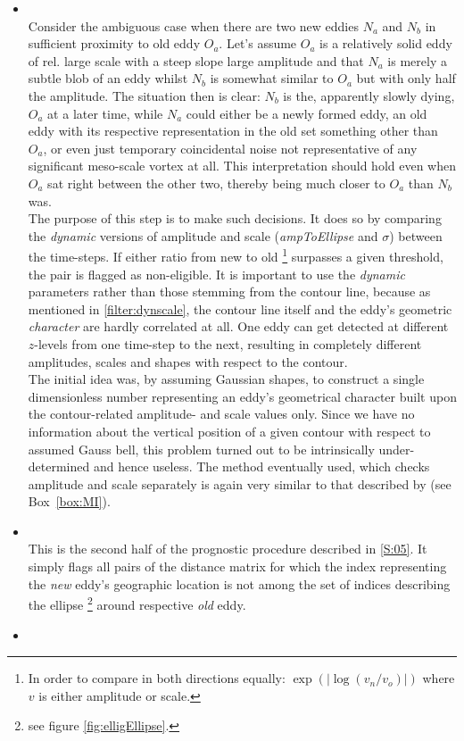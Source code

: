 \begin{itemize}
	\item
	 \\
	 Consider the ambiguous case when there are two new eddies $N_a$ and $N_b$ in sufficient proximity to old eddy $O_a$. Let's assume $O_a$ is a relatively solid eddy of rel. large scale with a steep slope \ie large amplitude and that $N_a$ is merely a subtle blob of an eddy whilst $N_b$ is somewhat similar to $O_a$ but with only half the amplitude. The situation then is clear: $N_b$ is the, apparently slowly dying, $O_a$ at a later time, while $N_a$ could either be a newly formed eddy, an old eddy with its respective representation in the old set something other than $O_a$, or even just temporary coincidental noise not representative of any significant meso-scale vortex at all. This interpretation should hold even when $O_a$ sat right between the other two, thereby being much closer to $O_a$ than $N_b$ was.\\
	 The purpose of this step is to make such decisions. It does so by comparing the \textit{dynamic} versions of amplitude and scale (\textit{ampToEllipse} and $\sigma$) between the time-steps. If either ratio from new to old \footnote{In order to compare in both directions equally: $\exp{(\left|\log{(v_n/v_o)}\right|)}$ where $v$ is either amplitude or scale.} surpasses a given threshold, the pair is flagged as non-eligible. It is important to use the \textit{dynamic} parameters rather than those stemming from the contour line, because as mentioned  in \cref{filter:dynscale}, the contour line itself and the eddy's  geometric \textit{character} are hardly correlated at all. One eddy can get detected at different $z$-levels from one time-step to the next, resulting in completely different amplitudes, scales and shapes with respect to the contour.\\
	The initial idea was, by assuming Gaussian shapes, to construct a single dimensionless number representing an eddy's geometrical character built upon the contour-related amplitude- and scale values only. Since we have no information about the vertical position of a given contour with respect to assumed Gauss bell, this problem turned out to be intrinsically under-determined and hence useless. The method eventually used, which checks amplitude and scale separately is again very similar to that described by \citeauthor{Chelton2011} (see Box~\cref{box:MI}).
	  \item
 \\
This is the second half of the prognostic procedure described in \cref{S:05}. It simply flags all pairs of the distance matrix for which the index representing the \textit{new} eddy's geographic location is not among the set of indices describing the ellipse \footnote{see figure \cref{fig:elligEllipse}.} around respective \textit{old} eddy.
 \item
 \\
\end{itemize}



